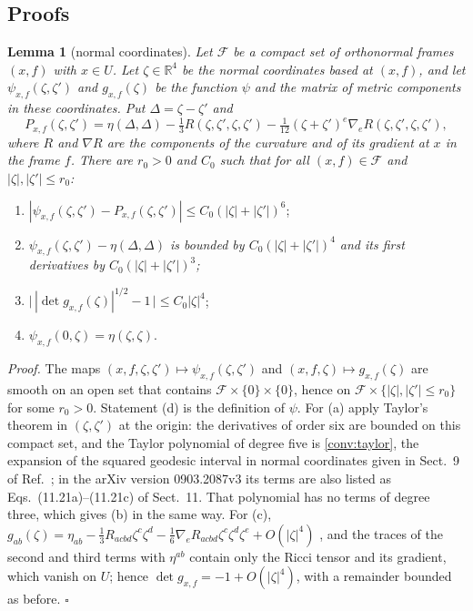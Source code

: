 \subsection{Proofs}
\noindent\textbf{Lemma 1} (normal coordinates). \emph{Let $\mathcal F$ be a
compact set of orthonormal frames $(x,f)$ with $x\in U$. Let
$\zeta\in\mathbb R^4$ be the normal coordinates based at $(x,f)$, and let
$\psi_{x,f}(\zeta,\zeta')$ and $g_{x,f}(\zeta)$ be the function $\psi$ and
the matrix of metric components in these coordinates. Put
$\Delta=\zeta-\zeta'$ and}
\begin{equation}
 P_{x,f}(\zeta,\zeta')=\eta(\Delta,\Delta)
 -\tfrac13R(\zeta,\zeta',\zeta,\zeta')
 -\tfrac1{12}(\zeta+\zeta')^e\nabla_eR(\zeta,\zeta',\zeta,\zeta'),
 \label{conv:taylor}
\end{equation}
\emph{where $R$ and $\nabla R$ are the components of the curvature and of
its gradient at $x$ in the frame $f$. There are $r_0>0$ and $C_0$ such that
for all $(x,f)\in\mathcal F$ and $|\zeta|,|\zeta'|\le r_0$:}
\begin{enumerate}
\item[(a)] $|\psi_{x,f}(\zeta,\zeta')-P_{x,f}(\zeta,\zeta')|\le
C_0(|\zeta|+|\zeta'|)^6$;
\item[(b)] \emph{$\psi_{x,f}(\zeta,\zeta')-\eta(\Delta,\Delta)$ is bounded
by $C_0(|\zeta|+|\zeta'|)^4$ and its first derivatives by
$C_0(|\zeta|+|\zeta'|)^3$;}
\item[(c)] $\bigl|\,|\det g_{x,f}(\zeta)|^{1/2}-1\,\bigr|\le C_0|\zeta|^4$;
\item[(d)] $\psi_{x,f}(0,\zeta)=\eta(\zeta,\zeta)$.
\end{enumerate}

\noindent\emph{Proof.} The maps
$(x,f,\zeta,\zeta')\mapsto\psi_{x,f}(\zeta,\zeta')$ and
$(x,f,\zeta)\mapsto g_{x,f}(\zeta)$ are smooth on an open set that contains
$\mathcal F\times\{0\}\times\{0\}$, hence on
$\mathcal F\times\{|\zeta|,|\zeta'|\le r_0\}$ for some $r_0>0$. Statement
(d) is the definition of $\psi$. For (a) apply Taylor's theorem in
$(\zeta,\zeta')$ at the origin: the derivatives of order six are bounded on
this compact set, and the Taylor polynomial of degree five is
\eqref{conv:taylor}, the expansion of the squared geodesic interval in
normal coordinates given in Sect.~9 of Ref.~\cite{brewin}; in the arXiv
version 0903.2087v3 its terms are also listed as Eqs.~(11.21a)--(11.21c) of
Sect.~11. That polynomial has no terms of degree three, which gives (b) in
the same way. For (c),
$g_{ab}(\zeta)=\eta_{ab}-\tfrac13R_{acbd}\zeta^c\zeta^d
-\tfrac16\nabla_eR_{acbd}\zeta^c\zeta^d\zeta^e+O(|\zeta|^4)$ \cite{brewin},
and the traces of the second and third terms with $\eta^{ab}$ contain only
the Ricci tensor and its gradient, which vanish on $U$; hence
$\det g_{x,f}=-1+O(|\zeta|^4)$, with a remainder bounded as before.
\hfill$\square$

